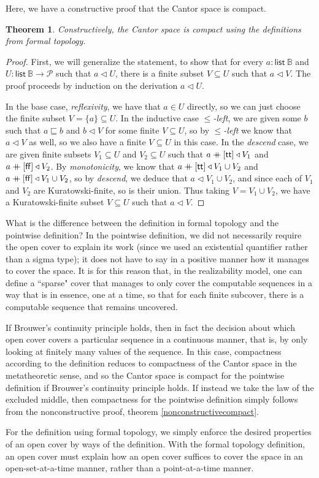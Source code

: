 \documentclass{article}           %
\newtheorem{theorem}{Theorem}
\newcommand{\Prop}{\mathcal{P}}
\newcommand{\bool}{\mathbb{B}}
\newcommand{\List}[1]{\mathsf{list}\ {#1}}
\newcommand{\cat}{\ensuremath{\mathbin{+\mkern-10mu+}}}
\newcommand{\cov}{\triangleleft}
\begin{document}
Here, we have a constructive proof that the Cantor space is compact. 
\begin{theorem}
Constructively, the Cantor space is compact using the definitions from formal topology.
\end{theorem}
\begin{proof}
First, we will generalize the statement, to show that for every $a : \List{\bool}$ and $U : \List{\bool} \to \Prop$ such that $a \cov U$, there is a finite subset $V \subseteq U$ such that $a \cov V$. The proof proceeds by induction on the derivation $a \cov U$.

In the base case, \emph{reflexivity}, we have that $a \in U$ directly, so we can just choose the finite subset $V = \{ a \} \subseteq U$. In the inductive case \emph{$\le$-left}, we are given some $b$ such that $a \sqsubseteq b$ and $b \cov V$ for some finite $V \subseteq U$, so by \emph{$\le$-left} we know that $a \cov V$ as well, so we also have a finite $V \subseteq U$ in this case. In the \emph{descend} case, we are given finite subsets $V_1 \subseteq U$ and $V_2 \subseteq U$ such that $a \cat [\mathsf{tt}] \cov V_1$ and $a \cat [\mathsf{ff}] \cov V_2$. By \emph{monotonicity}, we know that $a \cat [\mathsf{tt}] \cov V_1 \cup V_2$ and $a \cat [\mathsf{ff}] \cov V_1 \cup V_2$, so by \emph{descend}, we deduce that $a \cov V_1 \cup V_2$, and since each of $V_1$ and $V_2$ are Kuratowski-finite, so is their union. Thus taking $V = V_1 \cup V_2$, we have a Kuratowski-finite subset $V \subseteq U$ such that $a \cov V$.
\end{proof}

What is the difference between the definition in formal topology and the pointwise definition? In the pointwise definition, we did not necessarily require the open cover to explain its work (since we used an existential quantifier rather than a sigma type); it does not have to say in a positive manner how it manages to cover the space. It is for this reason that, in the realizability model, one can define a ``sparse" cover that manages to only cover the computable sequences in a way that is in essence, one at a time, so that for each finite subcover, there is a computable sequence that remains uncovered.

 If Brouwer's continuity principle holds, then in fact the decision about which open cover covers a particular sequence in a continuous manner, that is, by only looking at finitely many values of the sequence. In this case, compactness according to the definition reduces to compactness of the Cantor space in the metatheoretic sense, and so the Cantor space is compact for the pointwise definition if Brouwer's continuity principle holds. If instead we take the law of the excluded middle, then compactness for the pointwise definition simply follows from the nonconstructive proof, theorem \ref{nonconstructivecompact}.

For the definition using formal topology, we simply enforce the desired properties of an open cover by ways of the definition. With the formal topology definition, an open cover must explain how an open cover suffices to cover the space in an open-set-at-a-time manner, rather than a point-at-a-time manner.
\end{document}
